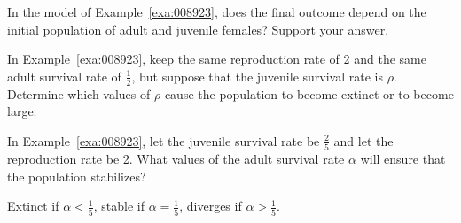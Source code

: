\begin{multicols}{2}
\begin{ex}
In the model of Example~\ref{exa:008923}, does the final outcome depend on the initial population of adult and juvenile females? Support your answer.
\end{ex}

\begin{ex}
In Example~\ref{exa:008923}, keep the same reproduction rate of 2 and the same adult survival rate of $\frac{1}{2}$, but suppose that the juvenile survival rate is $\rho$. Determine which values of $\rho$ cause the population to become extinct or to become large.
\end{ex}

\begin{ex}
In Example~\ref{exa:008923}, let the juvenile survival rate be $\frac{2}{5}$
 and let the reproduction rate be 2. What values of the adult survival rate $\alpha$ will ensure that the population stabilizes?

\begin{sol}
Extinct if $\alpha < \frac{1}{5}$, stable if $\alpha = \frac{1}{5}$, diverges if $\alpha > \frac{1}{5}$.
\end{sol}
\end{ex}

\end{multicols}








